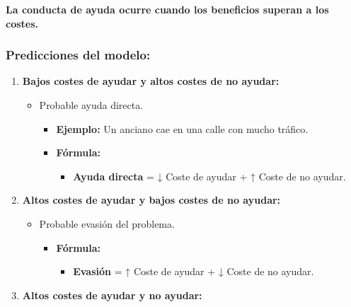 \documentclass[
]{book}
\providecommand{\tightlist}{%
  \setlength{\itemsep}{0pt}\setlength{\parskip}{0pt}}
\begin{document}
\textbf{La conducta de ayuda ocurre cuando los beneficios superan a los costes.}

\subsubsection{Predicciones del modelo:}\label{predicciones-del-modelo}

\begin{enumerate}
\def\labelenumi{\arabic{enumi}.}
\tightlist
\item
  \textbf{Bajos costes de ayudar y altos costes de no ayudar:}

  \begin{itemize}
  \tightlist
  \item
    Probable ayuda directa.

    \begin{itemize}
    \tightlist
    \item
      \textbf{Ejemplo:} Un anciano cae en una calle con mucho tráfico.\\
    \item
      \textbf{Fórmula:}

      \begin{itemize}
      \tightlist
      \item
        \textbf{Ayuda directa} = ↓ Coste de ayudar + ↑ Coste de no ayudar.
      \end{itemize}
    \end{itemize}
  \end{itemize}
\item
  \textbf{Altos costes de ayudar y bajos costes de no ayudar:}

  \begin{itemize}
  \tightlist
  \item
    Probable evasión del problema.

    \begin{itemize}
    \tightlist
    \item
      \textbf{Fórmula:}

      \begin{itemize}
      \tightlist
      \item
        \textbf{Evasión} = ↑ Coste de ayudar + ↓ Coste de no ayudar.
      \end{itemize}
    \end{itemize}
  \end{itemize}
\item
  \textbf{Altos costes de ayudar y no ayudar:}


\end{enumerate}
\end{document}
